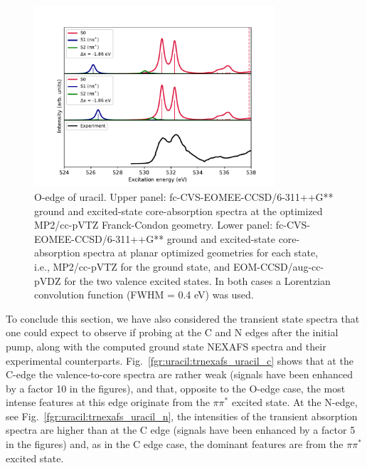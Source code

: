 \documentclass[journal=jctcce,manuscript=article]{achemso}
\begin{document}
\begin{figure}[H]
\includegraphics[width=0.8\textwidth]{Spectra/MP2_Uracil_Sn_O.pdf}
\caption{O-edge of uracil. 
Upper panel: fc-CVS-EOMEE-CCSD/6-311++G** ground and excited-state core-absorption spectra at the optimized MP2/cc-pVTZ Franck-Condon geometry. 
Lower panel: fc-CVS-EOMEE-CCSD/6-311++G** ground and excited-state core-absorption spectra at planar optimized geometries for each state, i.e., MP2/cc-pVTZ for the ground state, and EOM-CCSD/aug-cc-pVDZ for the two valence excited states. In both cases a Lorentzian convolution function (FWHM = 0.4 eV) was used.
\label{fgr:uracil:trnexafs_uracil_o:MP2CCSD}}
\end{figure}

To conclude this section, we have also considered the transient state spectra that one could expect to observe if probing at the C and N edges after the initial pump, along with the computed ground state NEXAFS spectra and their experimental counterparts.  
Fig.~\ref{fgr:uracil:trnexafs_uracil_c} shows that at the C-edge the valence-to-core spectra
are rather weak (signals have been enhanced by a factor 10 in the figures),
and that, opposite to the O-edge case, 
the most intense features at this edge originate from the $\pi\pi^*$ excited state.
At the N-edge, see Fig.~\ref{fgr:uracil:trnexafs_uracil_n},
the intensities of the transient absorption spectra are higher than
at the C edge (signals have been enhanced by a factor 5 in the figures)
and, as in the C edge case, the dominant features are from 
the $\pi\pi^*$ excited state. 
\end{document}
